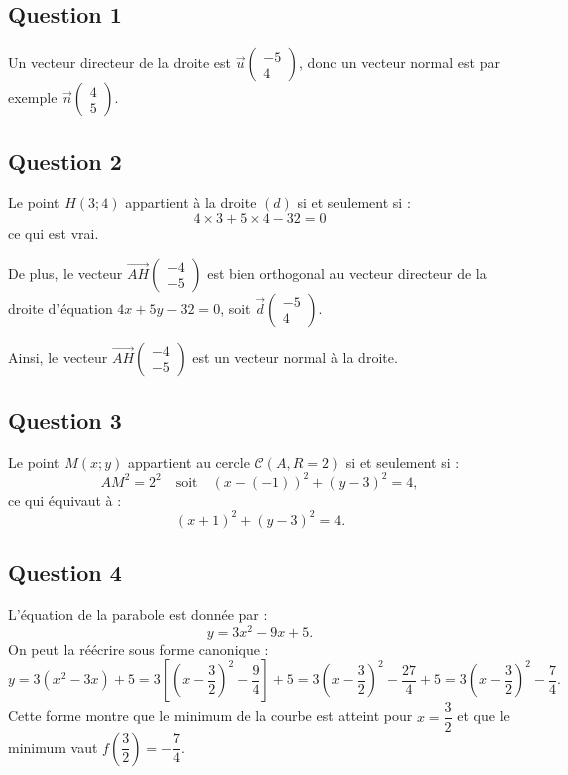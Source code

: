 \subsection*{Question 1}
	
	Un vecteur directeur de la droite est 
	$\vec u\begin{pmatrix} -5 \\ 4 \end{pmatrix}$, donc un vecteur normal est par exemple $\vec{n}  \begin{pmatrix} 4 \\ 5 \end{pmatrix}$.
	
	\subsection*{Question 2}
	
	Le point $H(3 ; 4)$ appartient à la droite $(d)$ si et seulement si :
	\[
	4 \times 3 + 5 \times 4 - 32 = 0
	\]
	ce qui est vrai.
	
	De plus, le vecteur $\overrightarrow{AH} \begin{pmatrix} -4 \\ -5 \end{pmatrix}$ est bien orthogonal au vecteur directeur de la droite d'équation $4x + 5y - 32 = 0$, soit $\vec d \begin{pmatrix} -5 \\ 4 \end{pmatrix}$.
	
	Ainsi, le vecteur $\overrightarrow{AH} \begin{pmatrix} -4 \\ -5 \end{pmatrix}$ est un vecteur normal à la droite.
	
	\subsection*{Question 3}
	
	Le point $M(x ; y)$ appartient au cercle $\mathcal{C}(A, R = 2)$ si et seulement si :
	\[
	AM^2 = 2^2 \quad \text{soit} \quad (x - (-1))^2 + (y - 3)^2 = 4,
	\]
	ce qui équivaut à :
	\[
	(x + 1)^2 + (y - 3)^2 = 4.
	\]
	
	\subsection*{Question 4}
	
	L'équation de la parabole est donnée par :
	\[
	y = 3x^2 - 9x + 5.
	\]
	On peut la réécrire sous forme canonique :
	\[
	y = 3 \left( x^2 - 3x \right) + 5 = 3 \left[ \left( x - \dfrac{3}{2} \right)^2 - \dfrac{9}{4} \right] + 5 = 3 \left( x - \dfrac{3}{2} \right)^2 - \dfrac{27}{4} + 5 = 3 \left( x - \dfrac{3}{2} \right)^2 - \dfrac{7}{4}.
	\]
	Cette forme montre que le minimum de la courbe est atteint pour $x = \dfrac{3}{2}$ et que le minimum vaut $f\left( \dfrac{3}{2} \right) = -\dfrac{7}{4}$.
	
